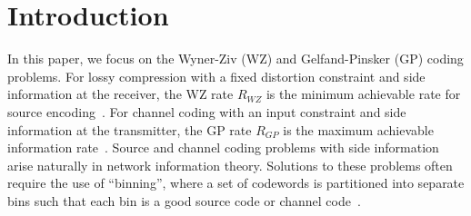 \section{Introduction}

In this paper, we focus on the Wyner-Ziv (WZ) and Gelfand-Pinsker (GP) coding problems.
For lossy compression with a fixed distortion constraint and side information at the receiver, the WZ rate $R_{WZ}$ is the minimum achievable rate for source encoding~\cite{Wyner-it76}.
For channel coding with an input constraint and side information at the transmitter, the GP rate $R_{GP}$ is the maximum achievable information rate~\cite{Gelfand-ppi80}.
Source and channel coding problems with side information arise naturally in network information theory.
Solutions to these problems often require the use of ``binning'', where a set of codewords is partitioned into separate bins such that each bin is a good source code or channel code~\cite{Cover-2006}.




